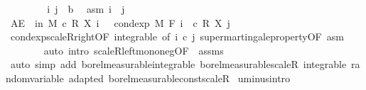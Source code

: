 \begin{isabellebody}
%
\isadelimproof
%
\endisadelimproof
%
\isatagproof
{}\isamarkupfalse%
\isanewline
\ \ \isacommand{{\isacharbraceleft}{\kern0pt}}\isamarkupfalse%
\isanewline
\ \ \ \ \isamarkupfalse%
\ i\ j\ {\isacharcolon}{\kern0pt}{\isacharcolon}{\kern0pt}\ {\isacharprime}{\kern0pt}b\ \isamarkupfalse%
\ asm{\isacharcolon}{\kern0pt}\ {\isachardoublequoteopen}i\ {\isasymle}\ j{\isachardoublequoteclose}\isanewline
\ \ \ \ \isamarkupfalse%
\ {\isachardoublequoteopen}AE\ {\isasymxi}\ in\ M{\isachardot}{\kern0pt}\ c\ {\isacharasterisk}{\kern0pt}\isactrlsub R\ X\ i\ {\isasymxi}\ {\isasymle}\ cond{\isacharunderscore}{\kern0pt}exp\ M\ {\isacharparenleft}{\kern0pt}F\ i{\isacharparenright}{\kern0pt}\ {\isacharparenleft}{\kern0pt}{\isasymlambda}{\isasymxi}{\isachardot}{\kern0pt}\ c\ {\isacharasterisk}{\kern0pt}\isactrlsub R\ X\ j\ {\isasymxi}{\isacharparenright}{\kern0pt}\ {\isasymxi}{\isachardoublequoteclose}\ \isanewline
\ \ \ \ \ \ \isamarkupfalse%
\ cond{\isacharunderscore}{\kern0pt}exp{\isacharunderscore}{\kern0pt}scaleR{\isacharunderscore}{\kern0pt}right{\isacharbrackleft}{\kern0pt}OF\ integrable{\isacharcomma}{\kern0pt}\ of\ i\ {\isachardoublequoteopen}c{\isachardoublequoteclose}\ j{\isacharbrackright}{\kern0pt}\ supermartingale{\isacharunderscore}{\kern0pt}property{\isacharbrackleft}{\kern0pt}OF\ asm{\isacharbrackright}{\kern0pt}\ \isanewline
\ \ \ \ \ \ \isamarkupfalse%
\ {\isacharparenleft}{\kern0pt}auto\ intro{\isacharbang}{\kern0pt}{\isacharcolon}{\kern0pt}\ scaleR{\isacharunderscore}{\kern0pt}left{\isacharunderscore}{\kern0pt}mono{\isacharunderscore}{\kern0pt}neg{\isacharbrackleft}{\kern0pt}OF\ {\isacharunderscore}{\kern0pt}\ assms{\isacharbrackright}{\kern0pt}{\isacharparenright}{\kern0pt}\isanewline
\ \ \isacommand{{\isacharbraceright}{\kern0pt}}\isamarkupfalse%
\isanewline
{}\isamarkupfalse%
\ {\isacharparenleft}{\kern0pt}auto\ simp\ add{\isacharcolon}{\kern0pt}\ borel{\isacharunderscore}{\kern0pt}measurable{\isacharunderscore}{\kern0pt}integrable\ borel{\isacharunderscore}{\kern0pt}measurable{\isacharunderscore}{\kern0pt}scaleR\ integrable\ random{\isacharunderscore}{\kern0pt}variable\ adapted\ borel{\isacharunderscore}{\kern0pt}measurable{\isacharunderscore}{\kern0pt}const{\isacharunderscore}{\kern0pt}scaleR{\isacharparenright}{\kern0pt}%
\endisatagproof
{\isafoldproof}%
%
\isadelimproof
\isanewline
%
\endisadelimproof
\isanewline
{}\isamarkupfalse%
\ uminus{\isacharbrackleft}{\kern0pt}intro{\isacharbrackright}{\kern0pt}{\isacharcolon}{\kern0pt}\isanewline

\end{isabellebody}
